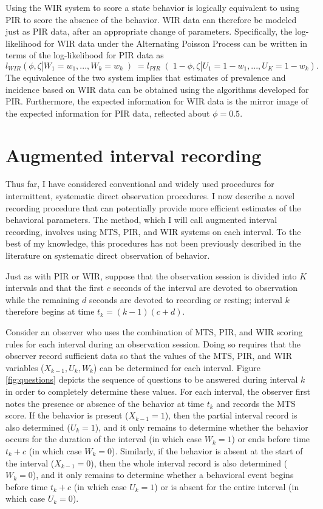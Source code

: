 \documentclass[man, noextraspace, floatsintext]{apa6}\usepackage[]{graphicx}\usepackage[]{color}
\begin{document}
Using the WIR system to score a state behavior is logically equivalent to using PIR to score the absence of the behavior. 
WIR data can therefore be modeled just as PIR data, after an appropriate change of parameters. 
Specifically, the log-likelihood for WIR data under the Alternating Poisson Process can be written in terms of the log-likelihood for PIR data as
\begin{equation}
l_{WIR}\left(\phi, \zeta | W_1 = w_1,...,W_k = w_k \left) = l_{PIR}\right(1 - \phi, \zeta | U_1 = 1 - w_1,...,U_K = 1 - w_k\right).
\end{equation}
The equivalence of the two system implies that estimates of prevalence and incidence based on WIR data can be obtained using the algorithms developed for PIR. Furthermore, the expected information for WIR data is the mirror image of the expected information for PIR data, reflected about $\phi = 0.5$. 


\section{Augmented interval recording}
\label{sec:AIR}

Thus far, I have considered conventional and widely used procedures for intermittent, systematic direct observation procedures. 
I now describe a novel recording procedure that can potentially provide more efficient estimates of the behavioral parameters. 
The method, which I will call augmented interval recording, involves using MTS, PIR, and WIR systems on each interval. 
To the best of my knowledge, this procedures has not been previously described in the literature on systematic direct observation of behavior. 

Just as with PIR or WIR, suppose that the observation session is divided into $K$ intervals and that the first $c$ seconds of the interval are devoted to observation while the remaining $d$ seconds are devoted to recording or resting; interval $k$ therefore begins at time $t_k = (k - 1)(c + d)$. 

Consider an observer who uses the combination of MTS, PIR, and WIR scoring rules for each interval during an observation session. 
Doing so requires that the observer record sufficient data so that the values of the MTS, PIR, and WIR variables ($X_{k-1},U_k,W_k$) can be determined for each interval. 
Figure \ref{fig:questions} depicts the sequence of questions to be answered during interval $k$ in order to completely determine these values. 
For each interval, the observer first notes the presence or absence of the behavior at time $t_k$ and records the MTS score. 
If the behavior is present ($X_{k-1} = 1$), then the partial interval record is also determined ($U_k = 1$), and it only remains to determine whether the behavior occurs for the duration of the interval (in which case $W_k = 1$) or ends before time $t_k + c$ (in which case $W_k = 0$). 
Similarly, if the behavior is absent at the start of the interval ($X_{k-1} = 0$), then the whole interval record is also determined ($W_k = 0$), and it only remains to determine whether a behavioral event begins before time $t_k + c$ (in which case $U_k = 1$) or is absent for the entire interval (in which case $U_k = 0$). 
\end{document}
